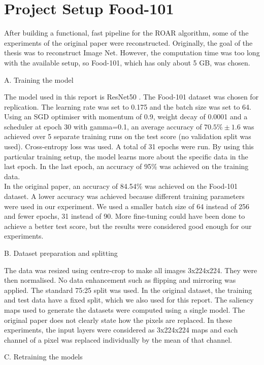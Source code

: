 \section{Project Setup Food-101}

After building a functional, fast pipeline for the ROAR algorithm, some of the experiments of the original paper were reconstructed. Originally, the goal of the thesis was to reconstruct Image Net. However, the computation time was too long with the available setup, so Food-101, which has only about 5 GB, was chosen.

A. Training the model

The model used in this report is ResNet50 \cite{he2015deep}. The Food-101 \cite{bossard14} dataset was chosen for replication. The learning rate was set to 0.175 and the batch size was set to 64. Using an SGD optimiser with momentum of 0.9, weight decay of 0.0001 and a scheduler at epoch 30 with gamma=0.1, an average accuracy of $70.5\% \pm 1.6$ was achieved over 5 separate training runs on the test score (no validation split was used). Cross-entropy loss was used. A total of 31 epochs were run. By using this particular training setup, the model learns more about the specific data in the last epoch. In the last epoch, an accuracy of 95\% was achieved on the training data.\\
In the original paper, an accuracy of 84.54\% was achieved on the Food-101 dataset. A lower accuracy was achieved because different training parameters were used in our experiment. We used a smaller batch size of 64 instead of 256 and fewer epochs, 31 instead of 90. More fine-tuning could have been done to achieve a better test score, but the results were considered good enough for our experiments.

B. Dataset preparation and splitting

The data was resized using centre-crop to make all images 3x224x224. They were then normalised. No data enhancement such as flipping and mirroring was applied. The standard 75:25 split was used. In the original dataset, the training and test data have a fixed split, which we also used for this report. The saliency maps used to generate the datasets were computed using a single model. The original paper does not clearly state how the pixels are replaced. In these experiments, the input layers were considered as 3x224x224 maps and each channel of a pixel was replaced individually by the mean of that channel.

C. Retraining the models

